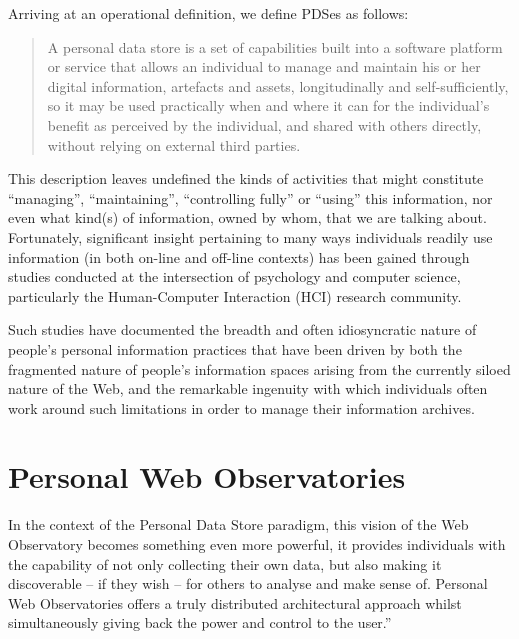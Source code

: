 \documentclass{acm_proc_article-sp}
\begin{document}
Arriving at an operational definition, we define PDSes as follows:

\begin{quote}

	A personal data store is a set of capabilities built into a software platform or service that allows an individual to manage and maintain his or her digital information, artefacts and assets, longitudinally and self-sufficiently, so it may be used practically when and where it can for the individual's benefit as perceived by the individual, and shared with others directly, without relying on external third parties. 

\end{quote}

This description leaves undefined the kinds of activities that might constitute ``managing'', ``maintaining'', ``controlling fully'' or ``using'' this information, nor even what kind(s) of information, owned by whom, that we are talking about.  Fortunately, significant insight pertaining to many ways individuals readily use information (in both on-line and off-line contexts) has been gained through studies conducted at the intersection of psychology and computer science, particularly the Human-Computer Interaction (HCI) research community.   

Such studies have documented the breadth and often idiosyncratic nature of people's personal information practices that have been driven by both the fragmented nature of people's information spaces arising from the currently siloed nature of the Web, and the remarkable ingenuity with which individuals often work around such limitations in order to manage their information archives. 

\section{Personal Web Observatories}
In the context of the Personal Data Store paradigm, this vision of the Web Observatory becomes something even more powerful, it provides individuals with the capability of not only collecting their own data, but also making it discoverable – if they wish – for others to analyse and make sense of. Personal Web Observatories offers a truly distributed architectural approach whilst simultaneously giving back the power and control to the user.”

\end{document}

